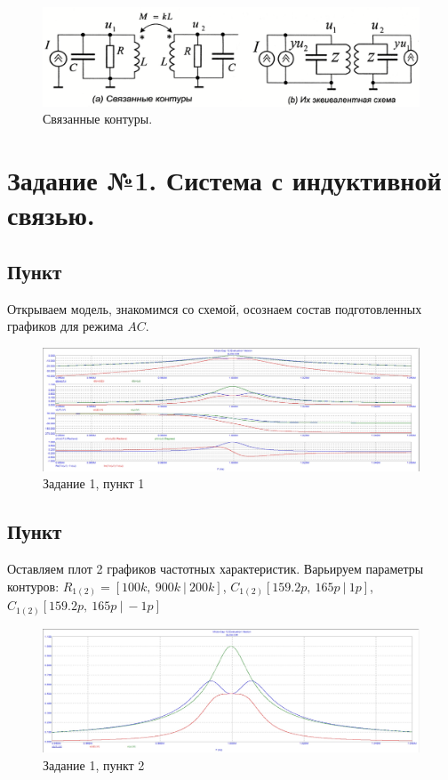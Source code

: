 \documentclass[a4paper, 14pt]{extarticle}%
\date{}
\begin{document}
\begin{figure}[H]
	\centering
	\includegraphics[width =  0.9\linewidth]{cvk}
	\caption{Связанные контуры.}
\end{figure}

\section{Задание №1. Система с индуктивной связью.}

\subsection{Пункт}

Открываем модель, знакомимся со схемой, осознаем состав подготовленных графиков для режима $AC$.

\begin{figure}[h!]
	\centering
			\includegraphics[width=1.1\linewidth]{1.1.jpg}
			\caption{Задание 1, пункт 1}
	\label{A}
\end{figure}


\subsection{Пункт}

Оставляем плот 2 графиков частотных характеристик. 
\newline
Варьируем параметры контуров:
\newline
$R_{1(2)} = [100k,  \: 900k \:| \: 200k]$, $C_{1(2)} [159.2p, \: 165p \: | \: 1p]$, $C_{1(2)} [159.2p, \: 165p \: | \: -1p]$

\begin{figure}[h!]
	\centering
			\includegraphics[width=1.1\linewidth]{1.2.jpg}
            \caption{Задание 1, пункт 2}
	\label{A}
\end{figure}
\end{document}
